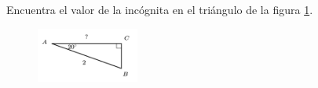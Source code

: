 Encuentra el valor de la incógnita en el triángulo de la figura \ref{fig:lados_functrig_11}.
\begin{figure}[H]
    \begin{center}
        \includegraphics[width=0.3\textwidth]{../images/lados_functrig_11.png}
    \end{center}
    \caption{}
    \label{fig:lados_functrig_11}
\end{figure}